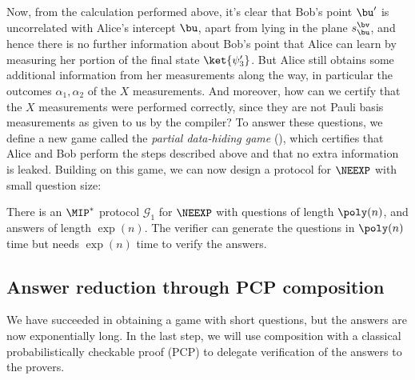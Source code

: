 \documentclass[11pt]{article}
\newcommand{\game}{\mathscr{G}}
\begin{document}
  Now, from the calculation performed above, it's clear that Bob's
  point $\bu'$ is uncorrelated with Alice's intercept $\bu$, apart
  from lying in the plane $s^{\bv}_{\bu}$, and hence there is no
  further information about Bob's point that Alice can learn by
  measuring her portion of the final state $\ket{\psi_3'}$. But Alice still obtains
  some additional information from her measurements along the way, in particular the
  outcomes $\alpha_1, \alpha_2$ of the $X$ measurements. And moreover,
  how can we certify that the $X$ measurements were performed
  correctly, since they are not Pauli basis measurements as given to
  us by the compiler? To answer these questions, we define a new game
  called the \emph{partial data-hiding game} (), which certifies that
  Alice and Bob perform the steps described above and that no
  extra information is leaked. Building on this game, we can now
  design a protocol for $\NEEXP$ with small question size:

 \begin{infthm}\label{thm:small-quest}
There is an $\MIP^*$ protocol $\game_{1}$ for $\NEEXP$ with questions
of length $\poly(n)$, and answers of length $\exp(n)$. The verifier can
generate the questions in $\poly(n)$ time but needs $\exp(n)$ time to
verify the answers.
\end{infthm}

\subsection{Answer reduction through PCP composition}
We have succeeded in obtaining a game with short questions, but the
answers are now exponentially long. In the last step, we will use
composition with a classical probabilistically checkable proof (PCP)
to delegate verification of the answers to the provers.
\end{document}
